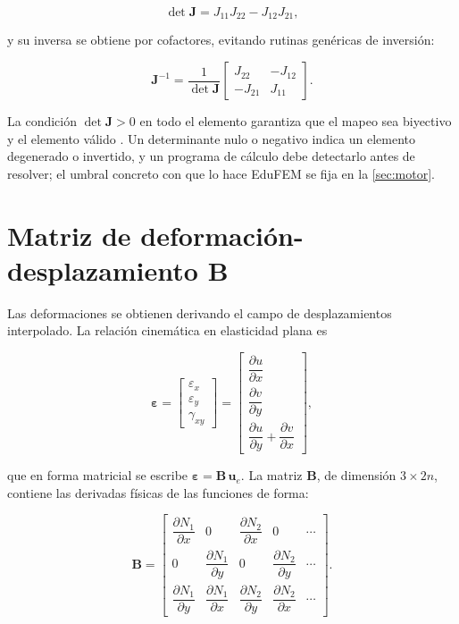 \begin{equation}
\det\bm{J} = J_{11}J_{22} - J_{12}J_{21},
\label{eq:detJ}
\end{equation}

y su inversa se obtiene por cofactores, evitando rutinas genéricas de inversión:

\begin{equation}
\bm{J}^{-1} = \frac{1}{\det\bm{J}}
\begin{bmatrix}
J_{22} & -J_{12} \\
-J_{21} & J_{11}
\end{bmatrix}.
\label{eq:invJ}
\end{equation}

La condición $\det\bm{J} > 0$ en todo el elemento garantiza que el mapeo sea biyectivo y el elemento válido \autocites[pp.~346-347]{bathe2014fem}[p.~236]{cook2002concepts}. Un determinante nulo o negativo indica un elemento degenerado o invertido, y un programa de cálculo debe detectarlo antes de resolver; el umbral concreto con que lo hace EduFEM se fija en la \autoref{sec:motor}.

\section{Matriz de deformación-desplazamiento B}
\label{sec:matriz-b}

Las deformaciones se obtienen derivando el campo de desplazamientos interpolado. La relación cinemática en elasticidad plana es

\begin{equation}
\bm{\varepsilon} =
\begin{bmatrix} \varepsilon_x \\ \varepsilon_y \\ \gamma_{xy} \end{bmatrix}
=
\begin{bmatrix}
\dfrac{\partial u}{\partial x} \\[4pt]
\dfrac{\partial v}{\partial y} \\[4pt]
\dfrac{\partial u}{\partial y} + \dfrac{\partial v}{\partial x}
\end{bmatrix},
\label{eq:cinematica}
\end{equation}

que en forma matricial se escribe $\bm{\varepsilon} = \bm{B}\,\bm{u}_e$. La matriz $\bm{B}$, de dimensión $3 \times 2n$, contiene las derivadas físicas de las funciones de forma:

\begin{equation}
\bm{B} =
\begin{bmatrix}
\dfrac{\partial N_1}{\partial x} & 0 & \dfrac{\partial N_2}{\partial x} & 0 & \cdots \\[6pt]
0 & \dfrac{\partial N_1}{\partial y} & 0 & \dfrac{\partial N_2}{\partial y} & \cdots \\[6pt]
\dfrac{\partial N_1}{\partial y} & \dfrac{\partial N_1}{\partial x} & \dfrac{\partial N_2}{\partial y} & \dfrac{\partial N_2}{\partial x} & \cdots
\end{bmatrix}.
\label{eq:matriz-B}
\end{equation}

